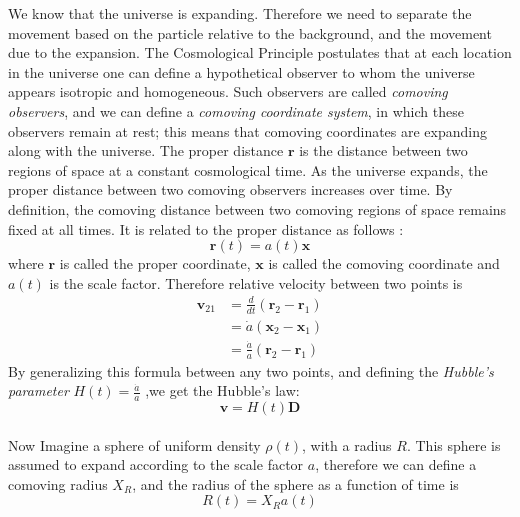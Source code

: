 \documentclass[14pt]{extarticle}
\begin{document}
We know that the universe is expanding. Therefore we need to separate the movement based on the particle relative to the background, and the movement due to the expansion. The Cosmological Principle postulates that at each location in the universe one can define a hypothetical observer to whom the universe appears isotropic and homogeneous. Such observers are called \textit{comoving observers}, and we can define a \textit{comoving coordinate system}, in which these observers remain at rest; this means that comoving coordinates are expanding along with the universe. The proper distance $\mathbf{r}$ is the distance between two regions of space at a constant cosmological time. As the universe expands, the proper distance between two comoving observers increases over time.  By definition, the comoving distance between two comoving regions of space remains fixed at all times. It is related to the proper distance as follows : \\
\begin{equation}
\mathbf{r}(t)=a(t) \mathbf{x}
\end{equation}
where $\mathbf{r}$ is called the proper coordinate, $\mathbf{x}$ is called the comoving coordinate and $a(t)$ is the scale factor. Therefore relative velocity between two points is\\
\begin{equation*}
\begin{aligned} 
\mathbf{v}_{21} &=\frac{d}{d t}\left(\mathbf{r}_{2}-\mathbf{r}_{1}\right) \\ &=\dot{a}\left(\mathbf{x}_{2}-\mathbf{x}_{1}\right) \\ &=\frac{\dot{a}}{a}\left(\mathbf{r}_{2}-\mathbf{r}_{1}\right) 
\end{aligned}
\end{equation*} 
By generalizing this formula between any two points, and defining the \textit{Hubble’s parameter} $H(t)=\frac{\dot{a}}{a}$ ,we get the Hubble's law:\\
\begin{equation}
\mathbf{v}=H(t) \mathbf{D}
\end{equation} \\ 
Now Imagine a sphere of uniform density $\rho(t)$, with a radius $R$. This sphere is assumed to expand according to the scale factor $a$, therefore we can define a comoving radius $X_{R}$, and the radius of the sphere as a function of time is \\
\begin{equation}
R(t)=X_{R} a(t)
\end{equation}
\end{document}
